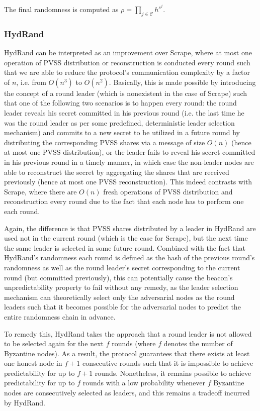 \documentclass[letterpaper,twocolumn,10pt]{article}
\theoremstyle{definition}
\theoremstyle{remark}
\begin{document}
The final randomness is computed as $\rho = \prod_{j \in \mathcal{C}} h^{s^j}$.

\subsubsection{HydRand}
HydRand can be interpreted as an improvement over Scrape, where at most one operation of PVSS distribution or reconstruction is conducted every round such that we are able to reduce the protocol's communication complexity by a factor of $n$, i.e. from $O(n^3)$ to $O(n^2)$. Basically, this is made possible by introducing the concept of a round leader (which is nonexistent in the case of Scrape) such that one of the following two scenarios is to happen every round: the round leader reveals his secret committed in his previous round (i.e. the last time he was the round leader as per some predefined, deterministic leader selection mechanism) and commits to a new secret to be utilized in a future round by distributing the corresponding PVSS shares via a message of size $O(n)$ (hence at most one PVSS distribution), or the leader fails to reveal his secret committed in his previous round in a timely manner, in which case the non-leader nodes are able to reconstruct the secret by aggregating the shares that are received previously (hence at most one PVSS reconstruction). This indeed contrasts with Scrape, where there are $O(n)$ fresh operations of PVSS distribution and reconstruction every round due to the fact that each node has to perform one each round.

Again, the difference is that PVSS shares distributed by a leader in HydRand are used not in the current round (which is the case for Scrape), but the next time the same leader is selected in some future round. Combined with the fact that HydRand's randomness each round is defined as the hash of the previous round's randomness as well as the round leader's secret corresponding to the current round (but committed previously), this can potentially cause the beacon's unpredictability property to fail without any remedy, as the leader selection mechanism can theoretically select only the adversarial nodes as the round leaders such that it becomes possible for the adversarial nodes to predict the entire randomness chain in advance.

To remedy this, HydRand takes the approach that a round leader is not allowed to be selected again for the next $f$ rounds (where $f$ denotes the number of Byzantine nodes). As a result, the protocol guarantees that there exists at least one honest node in $f + 1$ consecutive rounds such that it is impossible to achieve predictability for up to $f + 1$ rounds. Nonetheless, it remains possible to achieve predictability for up to $f$ rounds with a low probability whenever $f$ Byzantine nodes are consecutively selected as leaders, and this remains a tradeoff incurred by HydRand.
\end{document}
